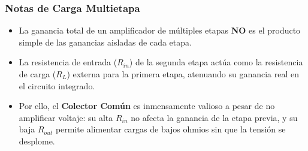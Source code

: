 \documentclass[11pt, a4paper]{article}
\begin{document}
\subsubsection*{Notas de Carga Multietapa}
\begin{itemize}
    \item La ganancia total de un amplificador de múltiples etapas \textbf{NO} es el producto simple de las ganancias aisladas de cada etapa.
    \item La resistencia de entrada ($R_{in}$) de la segunda etapa actúa como la resistencia de carga ($R_L$) externa para la primera etapa, atenuando su ganancia real en el circuito integrado.
    \item Por ello, el \textbf{Colector Común} es inmensamente valioso a pesar de no amplificar voltaje: su alta $R_{in}$ no afecta la ganancia de la etapa previa, y su baja $R_{out}$ permite alimentar cargas de bajos ohmios sin que la tensión se desplome.
\end{itemize}
\end{document}
